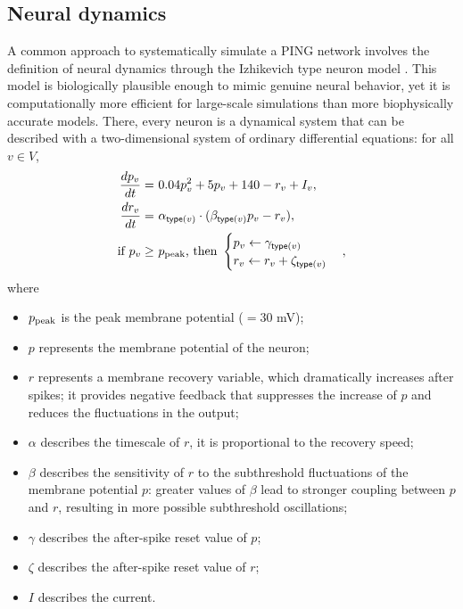 \subsection{Neural dynamics}
\label{sec:neural-dynamics}

A common approach to systematically simulate a PING network involves the definition of neural dynamics through the Izhikevich type neuron model  \cite{Izhikevich2003}. This model is biologically plausible enough to mimic genuine neural behavior, yet it is computationally more efficient for large-scale simulations than more biophysically accurate models. There, every neuron is a dynamical system that can be described with a two-dimensional system of ordinary differential equations: for all $v \in V$,
\begin{align}
    \frac{dp_v}{dt} =\ & 0.04 p_v^2 + 5p_v + 140 - r_v + I_v,
    \label{eq:Izhikevich-model-dp-dt} \\
    \frac{dr_v}{dt} =\ & \alpha_{\mathsf{type}(v)} \cdot (\beta_{\mathsf{type}(v)} p_v - r_v), \label{eq:Izhikevich-model-dr-dt} \\
    \text{if } p_v \geq\ & p_{\mathrm{peak}} \text{, then } 
    \begin{cases}
        p_v \leftarrow \gamma_{\mathsf{type}(v)} \\
        r_v \leftarrow r_v + \zeta_{\mathsf{type}(v)}
    \end{cases}, 
    \label{eq:Izhikevich-model-p30}
\end{align}
where
\begin{itemize}
    \item $p_{\mathrm{peak}}$ is the peak membrane potential ($= 30$ mV);
    
    \item $p$ represents the membrane potential of the neuron; 
    
    \item $r$ represents a membrane recovery variable, which dramatically increases after spikes; it provides negative feedback that suppresses the increase of $p$ and reduces the fluctuations in the output;
    
    \item $\alpha$ describes the timescale of $r$, it is proportional to the recovery speed;
    
    \item $\beta$ describes the sensitivity of $r$ to the subthreshold fluctuations of the membrane potential $p$: greater values of $\beta$ lead to stronger coupling between $p$ and $r$, resulting in more possible subthreshold oscillations;
    
    \item $\gamma$ describes the after-spike reset value of $p$;
    
    \item $\zeta$ describes the after-spike reset value of $r$;
    
    \item $I$ describes the current.
\end{itemize}
